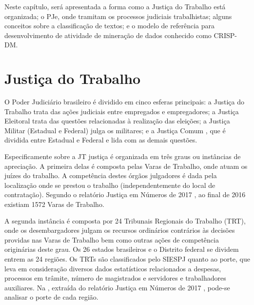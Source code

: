     Neste capítulo, será apresentada a forma como a Justiça do Trabalho está organizada; o PJe, onde tramitam os processos judiciais trabalhistas; alguns conceitos sobre a classificação de textos; e o modelo de referência para desenvolvimento de atividade de mineração de dados conhecido como CRISP-DM. 
%

\section{Justiça do Trabalho}%

O Poder Judiciário brasileiro é dividido em cinco esferas principais: a Justiça do Trabalho  trata das ações judiciais entre empregados e empregadores; a Justiça Eleitoral trata das questões relacionadas à  realização das eleições;  a Justiça Militar (Estadual e Federal)  julga os militares; e a Justiça Comum , que é dividida entre Estadual e Federal e lida com as demais questões. 

Especificamente sobre a JT justiça é organizada em três graus ou instâncias de apreciação. A primeira delas é composta pelas Varas de Trabalho, onde atuam os juízes do trabalho. A competência destes órgãos julgadores é dada pela localização onde se prestou o trabalho (independentemente do local de contratação). Segundo o relatório Justiça em Números de 2017 \cite{justicaemnumeros2017}, ao final de 2016 existiam 1572 Varas de Trabalho. 

A segunda instância é composta por 24 Tribunais Regionais do Trabalho (TRT), onde os desembargadores julgam os recursos ordinários contrários às decisões providas nas Varas de Trabalho bem como outras ações de competência originárias deste grau. Os 26 estados brasileiros e o Distrito federal se dividem entrem as 24 regiões. Os TRTs são classificados pelo SIESPJ quanto ao porte, que leva em consideração diversos dados estatísticos relacionados a despesas, processos em trâmite, número de magistrados e servidores e trabalhadores auxiliares. Na , extraída do relatório Justiça em Números de 2017 \cite{justicaemnumeros2017}, pode-se analisar o porte de cada região. 

%

